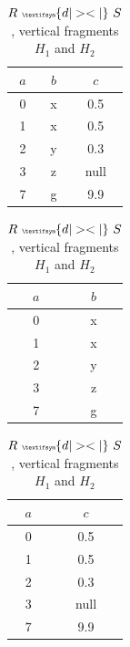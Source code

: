\begin{exmp}
\begin{table}[h]
    \centering
    \begin{tabular}{|c|c|c|}
        \hline
        $a$ & $b$ & $c$ \\
        \hline
        0 & x & 0.5 \\
        1 & x & 0.5 \\
        2 & y & 0.3 \\
        3 & z & null \\
        7 & g & 9.9 \\
        \hline
    \end{tabular}
    \hspace{30pt}
    \begin{tabular}{|c|c|}
        \hline
        $a$ & $b$ \\
        \hline
        0 & x \\
        1 & x \\
        2 & y \\
        3 & z \\
        7 & g \\
        \hline
    \end{tabular}
    \hspace{10pt}
    \begin{tabular}{|c|c|}
        \hline
        $a$ & $c$ \\
        \hline
        0 & 0.5 \\
        1 & 0.5 \\
        2 & 0.3 \\
        3 & null \\
        7 & 9.9 \\
        \hline
    \end{tabular}
    \caption{$R~{\tiny \textifsym{d|><|}}~S$, vertical fragments $H_1$ and $H_2$}
    \label{tab:join_vert_frag}
\end{table}

\end{exmp}



